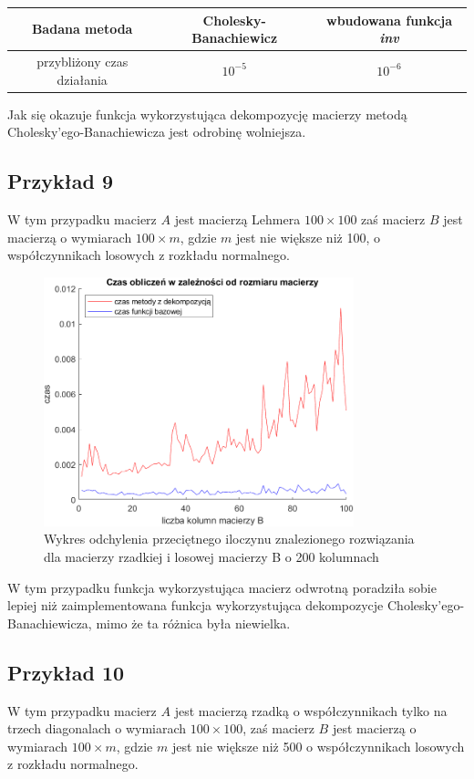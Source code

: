 \documentclass{article}
\begin{document}
\begin{center}
\begin{tabular}{ |c||c|c| }
 \hline
 Badana metoda & Cholesky-Banachiewicz & wbudowana funkcja \textit{inv}   \\
  \hline
    przybliżony czas działania & $10^{-5}$ & $10^{-6}$ \\
 \hline
\end{tabular}
\end{center}
Jak się okazuje funkcja wykorzystująca dekompozycję macierzy metodą Cholesky'ego-Banachiewicza jest odrobinę wolniejsza.
\subsection*{Przykład 9}
W tym przypadku macierz $A$ jest macierzą Lehmera  $100 \times 100$ zaś macierz $B$ jest macierzą o wymiarach $100 \times m$, gdzie $m$ jest nie większe niż 100, o współczynnikach losowych z rozkładu normalnego.

\begin{figure}[htp]
\centering
  \centering
  \includegraphics[width=9cm]{wykresy/przyklad9.png}
  \caption{Wykres odchylenia przeciętnego iloczynu znalezionego rozwiązania \\
  dla macierzy rzadkiej i losowej macierzy B o 200 kolumnach}
  \label{fig:sub1}
\label{fig:test}
\end{figure}


W tym przypadku funkcja wykorzystująca macierz odwrotną poradziła sobie lepiej niż zaimplementowana funkcja wykorzystująca dekompozycje Cholesky'ego-Banachiewicza, mimo że ta różnica była niewielka. 

\newpage

\subsection*{Przykład 10}
W tym przypadku macierz $A$ jest macierzą rzadką o współczynnikach tylko na trzech diagonalach o wymiarach $100 \times 100$, zaś macierz $B$ jest macierzą o wymiarach $100 \times m$,  gdzie $m$ jest nie większe niż 500 o współczynnikach losowych z rozkładu normalnego.
\end{document}
